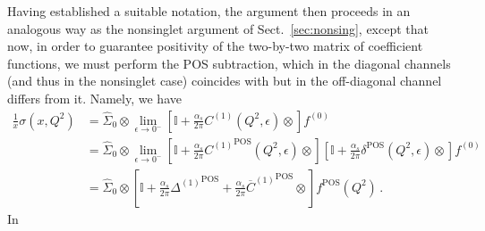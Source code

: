 Having established a suitable notation, the argument then proceeds
in an analogous way as the nonsinglet argument of
Sect.~\ref{sec:nonsing}, except that now, in order to guarantee
positivity of the two-by-two matrix of coefficient functions, we must
perform the POS subtraction, which in the diagonal
channels (and thus in the nonsinglet case) coincides with \msbar{} but
in the off-diagonal channel differs from it.
Namely, we have
\begin{align}
\frac{1}{x} \sigma(x,Q^2)&= \hat \Sigma_0\otimes
\lim_{\epsilon\to
  0^-}\left[\mathbb{I}
    +\frac{\alpha_s}{2\pi} C^{(1)}(Q^2,\epsilon) \otimes\right]
    f^{(0)} \label{eq:pos/posmsbar} \\
&= \hat \Sigma_0\otimes
\lim_{\epsilon\to
  0^-}\left[\mathbb{I}
  +\frac{\alpha_s}{2\pi} {C^{(1)}}^{{\textrm{POS}}}(Q^2,\epsilon) \otimes\right]
\left[\mathbb{I}
    +\frac{\alpha_s}{2\pi} \delta^{{\textrm{POS}}} (Q^2,\epsilon)\otimes\right]
    f^{(0)} \label{eq:pos/posmsbar1} \\
    &=  \hat \Sigma_0\otimes
\left[\mathbb{I}+ \frac{\alpha_s}{2\pi} {\Delta^{(1)}}^{{\textrm{POS}}}
  +\frac{\alpha_s}{2\pi}    {\overline{C}^{(1)}}^{{\textrm{POS}}} \otimes
  \right] 
     f^{{\textrm{POS}}}(Q^2) \,. \label{eq:pos/posmsbar2}
\end{align}
In 
